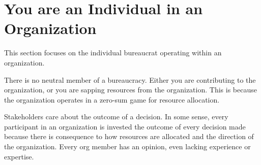 \documentclass{book}
\begin{document}
  \section{You are an Individual in an Organization}
  
    This section focuses on the individual bureaucrat operating within an organization. 
    
    There is no neutral member of a bureaucracy. Either you are contributing to the organization, or you are sapping resources from the organization. This is because the organization operates in a zero-sum game for resource allocation.
    
    
    
    
    
  \clearpage
    
    
    
    
    
    
    
    
  \clearpage


    Stakeholders care about the outcome of a decision. 
    In some sense, every participant in an organization is invested the outcome of every decision made because there is consequence to how resources are allocated and the direction of the organization. Every org member has an opinion, even lacking experience or expertise. 
    
    
    
%    
    
\end{document}
